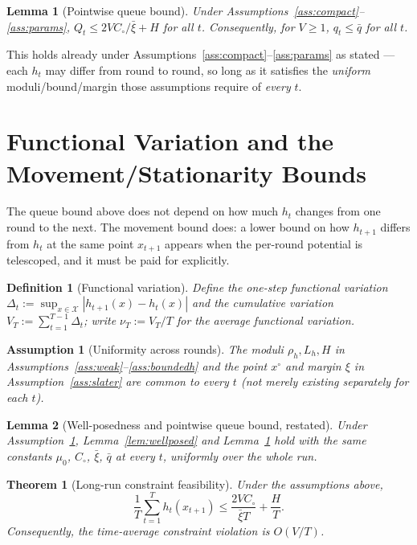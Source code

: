 \documentclass[10pt]{article}
\newtheorem{assumption}{Assumption}
\newtheorem{theorem}{Theorem}
\newtheorem{lemma}{Lemma}
\newtheorem{definition}{Definition}
\newcommand{\X}{\mathcal{X}}
\begin{document}
\begin{lemma}[Pointwise queue bound]
\label{lem:queuepoint}
Under Assumptions~\ref{ass:compact}--\ref{ass:params},
$Q_t\leq 2VC_\circ/\bar\xi+H$ for all $t$. Consequently, for $V\geq1$,
$q_t\leq\bar q$ for all $t$.
\end{lemma}

This holds already under Assumptions~\ref{ass:compact}--\ref{ass:params}
as stated --- each $h_t$ may differ from round to round, so long as it
satisfies the \emph{uniform} moduli/bound/margin those assumptions
require of \emph{every} $t$.

\section{Functional Variation and the Movement/Stationarity Bounds}
\label{sec:tv}

The queue bound above does not depend on how much $h_t$ changes from one
round to the next. The movement bound does: a lower bound on how
$h_{t+1}$ differs from $h_t$ at the same point $x_{t+1}$ appears when the
per-round potential is telescoped, and it must be paid for explicitly.

\begin{definition}[Functional variation]
\label{def:variation}
Define the one-step functional variation
$\Delta_t:=\sup_{x\in\X}|h_{t+1}(x)-h_t(x)|$
and the cumulative variation $V_T:=\sum_{t=1}^{T-1}\Delta_t$; write
$\nu_T:=V_T/T$ for the average functional variation.
\end{definition}

\begin{assumption}[Uniformity across rounds]
\label{ass:tv}
The moduli $\rho_h,L_h,H$ in Assumptions~\ref{ass:weak}--\ref{ass:boundedh}
and the point $x^{\circ}$ and margin $\xi$ in
Assumption~\ref{ass:slater} are common to every $t$ (not merely existing
separately for each $t$).
\end{assumption}

\begin{lemma}[Well-posedness and pointwise queue bound, restated]
\label{lem:tv-queue}
Under Assumption~\ref{ass:tv}, Lemma~\ref{lem:wellposed} and
Lemma~\ref{lem:queuepoint} hold with the same constants $\mu_0$,
$C_\circ$, $\bar\xi$, $\bar q$ at every $t$, uniformly over the whole run.
\end{lemma}

\begin{theorem}[Long-run constraint feasibility]
\label{thm:feasibility}
Under the assumptions above,
\begin{equation}
\frac1T\sum_{t=1}^T h_t(x_{t+1})
\leq
\frac{2VC_\circ}{\bar\xi T}+\frac HT.
\label{eq:avg-feas}
\end{equation}
Consequently, the time-average constraint violation is $O(V/T)$.
\end{theorem}
\end{document}
